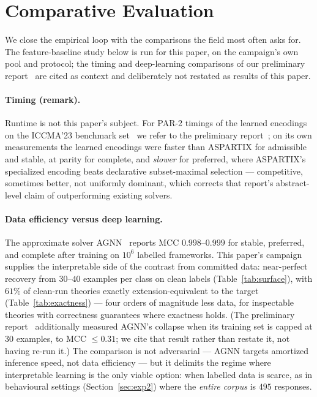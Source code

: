 \documentclass[review,12pt]{elsarticle}
\theoremstyle{definition}
\theoremstyle{remark}
\begin{document}
\section{Comparative Evaluation}
\label{sec:eval}

We close the empirical loop with the comparisons the field most often asks
for. The feature-baseline study below is run for this paper, on the
campaign's own pool and protocol; the timing and deep-learning comparisons of
our preliminary report~\citep{mileva2023prelim} are cited as context and
deliberately not restated as results of this paper.

\paragraph{Timing (remark).} Runtime is not this paper's subject. For PAR-2
timings of the learned encodings on the ICCMA'23 benchmark
set~\citep{iccma23} we refer to the preliminary
report~\citep{mileva2023prelim}; on its own measurements the learned
encodings were faster than ASPARTIX for admissible and stable, at parity for
complete, and \emph{slower} for preferred, where ASPARTIX's specialized
encoding beats declarative subset-maximal selection --- competitive,
sometimes better, not uniformly dominant, which corrects that report's
abstract-level claim of outperforming existing solvers.

\paragraph{Data efficiency versus deep learning.} The approximate solver
AGNN~\citep{craandijkbex2020} reports MCC $0.998$--$0.999$ for stable,
preferred, and complete after training on $10^{6}$ labelled frameworks. This
paper's campaign supplies the interpretable side of the contrast from
committed data: near-perfect recovery from $30$--$40$ examples per class on
clean labels (Table~\ref{tab:surface}), with $61\%$ of clean-run theories
exactly extension-equivalent to the target (Table~\ref{tab:exactness}) ---
four orders of magnitude less data, for inspectable theories with
correctness guarantees where exactness holds. (The preliminary
report~\citep{mileva2023prelim} additionally measured AGNN's collapse when
its training set is capped at $30$ examples, to MCC $\le 0.31$; we cite that
result rather than restate it, not having re-run it.) The comparison is not
adversarial --- AGNN targets amortized inference speed, not data efficiency
--- but it delimits the regime where interpretable learning is the only
viable option: when labelled data is scarce, as in behavioural settings
(Section~\ref{sec:exp2}) where the \emph{entire corpus} is $495$ responses.
\end{document}
